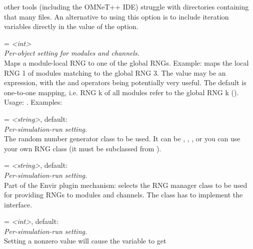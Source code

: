 \begin{description}
    other tools (including the OMNeT++ IDE) struggle with directories
    containing that many files. An alternative to using this option is to
    include iteration variables directly in the value of the
     option.
\item[**.rng-\%] = \textit{<int>}\\
    \textit{Per-object setting for modules and channels.}\\
    Maps a module-local RNG to one of the global RNGs. Example:
    maps the local RNG 1 of modules matching  to the
    global RNG 3. The value may be an expression, with the  and
     operators being potentially very useful. The
    default is one-to-one mapping, i.e. RNG k of all modules refer to the
    global RNG k ().\\
    Usage:
    .
    Examples:
\item[rng-class] = \textit{<string>}, default: \\
    \textit{Per-simulation-run setting.}\\
    The random number generator class to be used. It can be
    , , , or you can use
    your own RNG class (it must be subclassed from ).
\item[rngmanager-class] = \textit{<string>}, default: \\
    \textit{Per-simulation-run setting.}\\
    Part of the Envir plugin mechanism: selects the RNG manager class to be
    used for providing RNGs to modules and channels. The class has to implement
    the  interface.
\item[runnumber-width] = \textit{<int>}, default: \\
    \textit{Per-simulation-run setting.}\\
    Setting a nonzero value will cause the  variable to get

\end{description}
